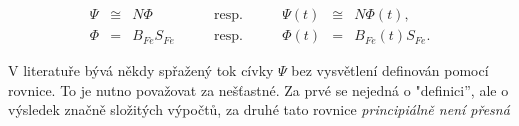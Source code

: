       \begin{equation}
        \begin{array}{rclclcl} 
          \Psi & \cong & N\Phi   & \qquad \text{resp.}  & \qquad \Psi(t)& \cong & N\Phi(t),    \\ 
          \Phi & = & B_{Fe}S_{Fe}& \qquad \text{resp.}  & \qquad \Phi(t)& = & B_{Fe}(t)S_{Fe}.
        \end{array}
      \end{equation}
      
      V literatuře bývá někdy spřažený tok cívky $\Psi$ bez vysvětlení definován pomocí rovnice. To
      je nutno považovat za nešťastné. Za prvé se nejedná o "definici'', ale o výsledek značně
      složitých výpočtů, za druhé tato rovnice \emph{principiálně není přesná}

\printbibliography[heading=subbibliography]